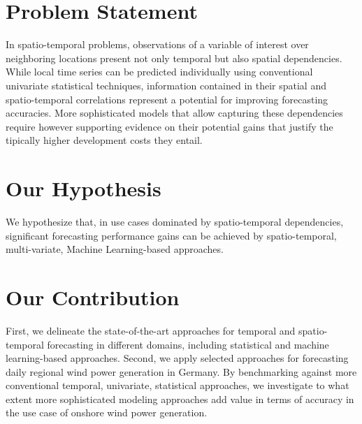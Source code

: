 \section{Problem Statement}
In spatio-temporal problems, observations of a variable of interest over neighboring locations present not only temporal but also spatial dependencies.
While local time series can be predicted individually using conventional univariate statistical techniques, information contained in their spatial and spatio-temporal correlations represent a potential for improving forecasting accuracies.
More sophisticated models that allow capturing these dependencies require however supporting evidence on their potential gains that justify the tipically higher development costs they entail.

\section{Our Hypothesis}
We hypothesize that, in use cases dominated by spatio-temporal dependencies, significant forecasting performance gains can be achieved by spatio-temporal, multi-variate, Machine Learning-based approaches.

\section{Our Contribution}
First, we delineate the state-of-the-art approaches for temporal and spatio-temporal forecasting in different domains, including statistical and machine learning-based approaches.
Second, we apply selected approaches for forecasting daily regional wind power generation in Germany.
By benchmarking against more conventional temporal, univariate, statistical approaches, we investigate to what extent more sophisticated modeling approaches add value in terms of accuracy in the use case of onshore wind power generation.